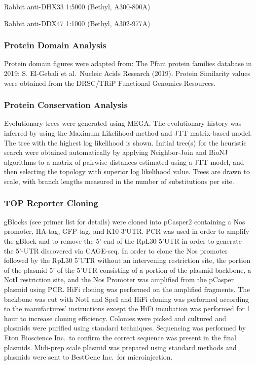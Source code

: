 \documentclass[12pt,oneside]{reedthesis}
\begin{document}
Rabbit anti-DHX33 1:5000 (Bethyl, A300-800A)

Rabbit anti-DDX47 1:1000 (Bethyl, A302-977A)

\hypertarget{protein-domain-analysis}{%
\subsubsection{Protein Domain Analysis}\label{protein-domain-analysis}}

Protein domain figures were adapted from: The Pfam protein families database in 2019: S. El-Gebali et al.~Nucleic Acids Research (2019). Protein Similarity values were obtained from the DRSC/TRiP Functional Genomics Resources.

\hypertarget{protein-conservation-analysis}{%
\subsubsection{Protein Conservation Analysis}\label{protein-conservation-analysis}}

Evolutionary trees were generated using MEGA. The evolutionary history was inferred by using the Maximum Likelihood method and JTT matrix-based model. The tree with the highest log likelihood is shown. Initial tree(s) for the heuristic search were obtained automatically by applying Neighbor-Join and BioNJ algorithms to a matrix of pairwise distances estimated using a JTT model, and then selecting the topology with superior log likelihood value. Trees are drawn to scale, with branch lengths measured in the number of substitutions per site.

\hypertarget{top-reporter-cloning}{%
\subsubsection{TOP Reporter Cloning}\label{top-reporter-cloning}}

gBlocks (see primer list for details) were cloned into pCasper2 containing a Nos promoter, HA-tag, GFP-tag, and K10 3'UTR. PCR was used in order to amplify the gBlock and to remove the 5'-end of the RpL30 5'UTR in order to generate the 5'-UTR discovered via CAGE-seq. In order to clone the Nos promoter followed by the RpL30 5'UTR without an intervening restriction site, the portion of the plasmid 5' of the 5'UTR consisting of a portion of the plasmid backbone, a NotI restriction site, and the Nos Promoter was amplified from the pCasper plasmid using PCR. HiFi cloning was performed on the amplified fragments. The backbone was cut with NotI and SpeI and HiFi cloning was performed according to the manufactures' instructions except the HiFi incubation was performed for 1 hour to increase cloning efficiency. Colonies were picked and cultured and plasmids were purified using standard techniques. Sequencing was performed by Eton Bioscience Inc.~to confirm the correct sequence was present in the final plasmids. Midi-prep scale plasmid was prepared using standard methods and plasmids were sent to BestGene Inc.~for microinjection.
\end{document}
